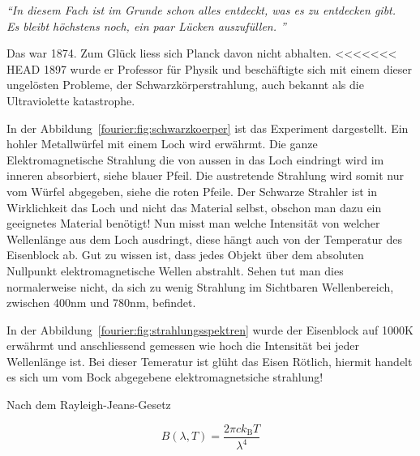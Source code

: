 	\begin{center}
		\textit{``{}In diesem Fach ist im Grunde schon alles entdeckt, was es zu entdecken gibt.\\
			Es bleibt höchstens noch, ein paar Lücken auszufüllen. ''}
	\end{center}
	
	Das war 1874.
	Zum Glück liess sich Planck davon nicht abhalten.
<<<<<<< HEAD
	1897 wurde er Professor für Physik und beschäftigte sich mit einem dieser ungelösten Probleme, der Schwarzkörperstrahlung, auch bekannt als die Ultraviolette katastrophe. 
	
	
	In der Abbildung~\ref{fourier:fig:schwarzkoerper} ist das Experiment dargestellt. Ein hohler Metallwürfel mit einem Loch wird erwährmt. Die ganze Elektromagnetische Strahlung die von aussen in das Loch eindringt wird im inneren absorbiert, siehe blauer Pfeil. Die austretende Strahlung wird somit nur vom Würfel abgegeben, siehe die roten Pfeile. Der Schwarze Strahler ist in Wirklichkeit das Loch und nicht das Material selbst, obschon man dazu ein geeignetes Material benötigt! Nun misst man welche Intensität von welcher Wellenlänge aus dem Loch ausdringt, diese hängt auch von der Temperatur des Eisenblock ab. 
	Gut zu wissen ist, dass jedes Objekt über dem absoluten Nullpunkt elektromagnetische Wellen abstrahlt. 
	Sehen tut man dies normalerweise nicht, da sich zu wenig Strahlung im Sichtbaren Wellenbereich, zwischen 400nm und 780nm,  befindet. 
	
	
	
	In der Abbildung~\ref{fourier:fig:strahlungsspektren} wurde der Eisenblock auf 1000K erwährmt und anschliessend gemessen wie hoch die Intensität bei jeder Wellenlänge ist.
	Bei dieser Temeratur ist glüht das Eisen Rötlich, hiermit handelt es sich um vom Bock abgegebene elektromagnetsiche strahlung!
	
	
	Nach dem Rayleigh-Jeans-Gesetz 
	
	\begin{equation}
		B(\lambda, T) = \frac{2 \pi c k_\mathrm{B} T}{\lambda^4}
	\end{equation}
	
